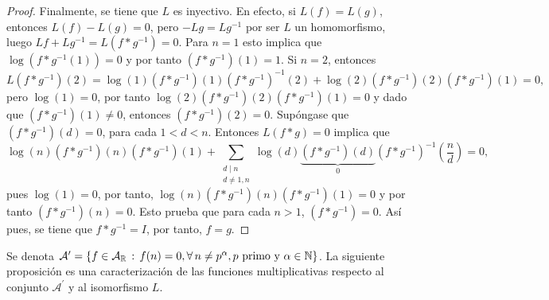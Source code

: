 \begin{proof}
Finalmente, se tiene que $L$ es inyectivo. En efecto, si $L(f)=L(g)$, entonces $L(f)-L(g)=0$, pero $-L g=L g^{-1}$ por ser $L$ un homomorfismo, luego $L f+L g^{-1}=L(f*g^{-1})=0$. Para $n=1$ esto implica que $\log(f*g^{-1}(1))=0$ y por tanto $(f*g^{-1})(1)=1$. Si $n=2$, entonces
\begin{equation*}
    L(f*g^{-1})(2) = \log(1)(f*g^{-1})(1)(f*g^{-1})^{-1}(2) + \log(2)(f*g^{-1})(2)(f*g^{-1})(1) = 0,
\end{equation*}
pero $\log(1)=0$, por tanto $\log(2)(f*g^{-1})(2)(f*g^{-1})(1)=0$ y dado que $(f*g^{-1})(1) \ne 0$, entonces $(f*g^{-1})(2)=0$. Supóngase que $(f*g^{-1})(d)=0$, para cada $1<d<n$. Entonces $L(f*g)=0$ implica que
\begin{equation*}
	\log(n)(f*g^{-1})(n)(f*g^{-1})(1) + \sum_{\substack{d \mid n \\ d \ne 1,n}} \log(d)\underbrace{(f*g^{-1})(d)}_{0}(f*g^{-1})^{-1} \left( \frac{n}{d} \right) = 0,
\end{equation*}
pues $\log(1)=0$, por tanto, $\log(n)(f*g^{-1})(n)(f*g^{-1})(1)=0$ y por tanto $(f*g^{-1})(n)=0$. Esto prueba que para cada $n>1$, $(f*g^{-1})=0$. Así pues, se tiene que $f*g^{-1}=I$, por tanto, $f=g$.
\end{proof}

Se denota $\mathcal{A}^\prime=\{ f \in \mathcal{A}_{\mathbb{R}} \std f(n) = 0,\forall n \ne p^\alpha, p \text{ primo y } \alpha \in \mathbb{N} \}$. La siguiente proposición es una caracterización de las funciones multiplicativas respecto al conjunto $\mathcal{A}^\prime$ y al isomorfismo $L$.

